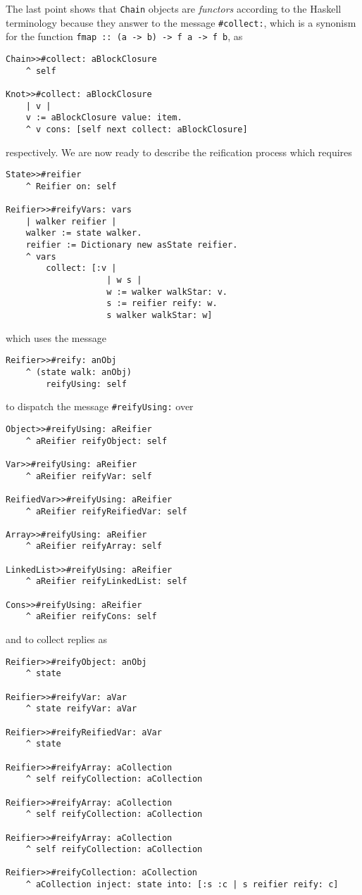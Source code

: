 \documentclass[a4paper,11pt]{article}
\begin{document}
The last point shows that \Verb|Chain| objects are \textit{functors} according
to the Haskell terminology because they answer to the message \Verb|#collect:|,
which is a synonism for the function \Verb|fmap :: (a -> b) -> f a -> f b|, as
\begin{verbatim}
Chain>>#collect: aBlockClosure
    ^ self

Knot>>#collect: aBlockClosure
    | v |
    v := aBlockClosure value: item.
    ^ v cons: [self next collect: aBlockClosure]
\end{verbatim}
respectively.  We are now ready to describe the reification process which
requires
\begin{verbatim}
State>>#reifier
    ^ Reifier on: self

Reifier>>#reifyVars: vars
    | walker reifier |
    walker := state walker.
    reifier := Dictionary new asState reifier.
    ^ vars
        collect: [:v |
                    | w s |
                    w := walker walkStar: v.
                    s := reifier reify: w.
                    s walker walkStar: w]
\end{verbatim}
which uses the message
\begin{verbatim}
Reifier>>#reify: anObj 
    ^ (state walk: anObj) 
        reifyUsing: self
\end{verbatim}
to dispatch the message \Verb|#reifyUsing:| over
\begin{verbatim}
Object>>#reifyUsing: aReifier
    ^ aReifier reifyObject: self 

Var>>#reifyUsing: aReifier 
    ^ aReifier reifyVar: self 

ReifiedVar>>#reifyUsing: aReifier 
    ^ aReifier reifyReifiedVar: self

Array>>#reifyUsing: aReifier
    ^ aReifier reifyArray: self 

LinkedList>>#reifyUsing: aReifier 
    ^ aReifier reifyLinkedList: self 

Cons>>#reifyUsing: aReifier 
    ^ aReifier reifyCons: self 
\end{verbatim}
and to collect replies as
\begin{verbatim}
Reifier>>#reifyObject: anObj 
    ^ state

Reifier>>#reifyVar: aVar 
    ^ state reifyVar: aVar

Reifier>>#reifyReifiedVar: aVar 
    ^ state

Reifier>>#reifyArray: aCollection 
    ^ self reifyCollection: aCollection

Reifier>>#reifyArray: aCollection 
    ^ self reifyCollection: aCollection

Reifier>>#reifyArray: aCollection 
    ^ self reifyCollection: aCollection

Reifier>>#reifyCollection: aCollection 
    ^ aCollection inject: state into: [:s :c | s reifier reify: c]
\end{verbatim}
\end{document}
